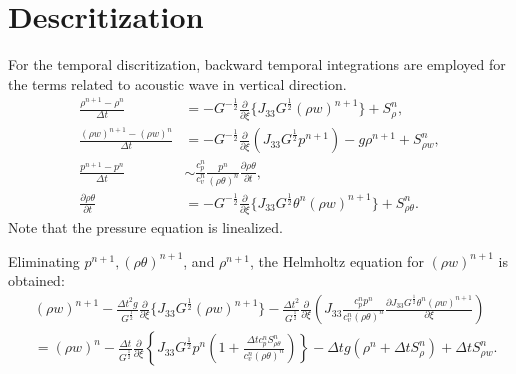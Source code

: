 \section{Descritization}

For the temporal discritization, backward temporal integrations are employed for the terms related to acoustic wave in vertical direction.
\begin{align}
  \frac{\rho^{n+1}-\rho^n}{\Delta t}
  &= -G^{-\frac{1}{2}}\frac{\partial}{\partial \xi}\{J_{33}G^{\frac{1}{2}}(\rho w)^{n+1}\} + S_\rho^n, \\
  \frac{(\rho w)^{n+1}-(\rho w)^n}{\Delta t}
  &= -G^{-\frac{1}{2}}\frac{\partial}{\partial \xi}(J_{33}G^{\frac{1}{2}}p^{n+1}) -g\rho^{n+1} + S_{\rho w}^n, \\
  \frac{p^{n+1} - p^n}{\Delta t}
  &\sim \frac{c_p^n}{c_v^n} \frac{p^n}{(\rho\theta)^n}\frac{\partial \rho\theta}{\partial t}, \\
  \frac{\partial \rho\theta}{\partial t}
  &= -G^{-\frac{1}{2}}\frac{\partial}{\partial \xi}\{J_{33}G^{\frac{1}{2}}\theta^n (\rho w)^{n+1}\} + S_{\rho\theta}^n.
\end{align}
Note that the pressure equation is linealized.

Eliminating $p^{n+1}, (\rho\theta)^{n+1}$, and $\rho^{n+1}$, the Helmholtz equation for $(\rho w)^{n+1}$ is obtained:
\begin{align}
  &
  (\rho w)^{n+1}
  - \frac{\Delta t^2 g}{G^{\frac{1}{2}}}\frac{\partial}{\partial \xi} \{J_{33}G^{\frac{1}{2}}(\rho w)^{n+1}\}
  - \frac{\Delta t^2}{G^{\frac{1}{2}}}\frac{\partial}{\partial \xi}\left(J_{33}\frac{c_p^n p^n}{c_v^n (\rho\theta)^n}\frac{\partial J_{33}G^{\frac{1}{2}}\theta^n (\rho w)^{n+1}}{\partial \xi}\right) \nonumber\\
  &= (\rho w)^n
  - \frac{\Delta t}{G^{\frac{1}{2}}}\frac{\partial}{\partial \xi}\left\{J_{33}G^{\frac{1}{2}}p^n\left(1+\frac{\Delta t c_p^n S_{\rho\theta}^n}{c_v^n (\rho\theta)^n}\right)\right\}
  - \Delta t g (\rho^n + \Delta t S_\rho^n)
  + \Delta t S_{\rho w}^n.
\end{align}

